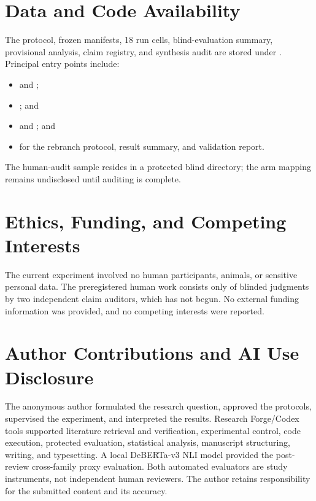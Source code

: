 \documentclass[11pt]{article}
\begin{document}
\section*{Data and Code Availability}

The protocol, frozen manifests, 18 run cells, blind-evaluation summary, provisional analysis, claim registry, and synthesis audit are stored under . Principal entry points include:
\begin{itemize}
  \item {} and ;
  \item {}; and
  \item {} and ; and
  \item {} for the rebranch protocol, result summary, and validation report.
\end{itemize}
The human-audit sample resides in a protected blind directory; the arm mapping remains undisclosed until auditing is complete.

\section*{Ethics, Funding, and Competing Interests}

The current experiment involved no human participants, animals, or sensitive personal data. The preregistered human work consists only of blinded judgments by two independent claim auditors, which has not begun. No external funding information was provided, and no competing interests were reported.

\section*{Author Contributions and AI Use Disclosure}

The anonymous author formulated the research question, approved the protocols, supervised the experiment, and interpreted the results. Research Forge/Codex tools supported literature retrieval and verification, experimental control, code execution, protected evaluation, statistical analysis, manuscript structuring, writing, and typesetting. A local DeBERTa-v3 NLI model provided the post-review cross-family proxy evaluation. Both automated evaluators are study instruments, not independent human reviewers. The author retains responsibility for the submitted content and its accuracy.
\end{document}
